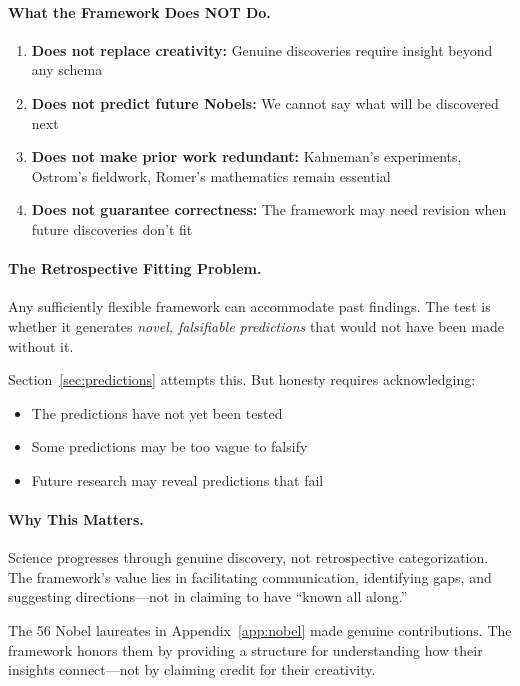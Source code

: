 \paragraph{What the Framework Does NOT Do.}
\begin{enumerate}
  \item \textbf{Does not replace creativity:} Genuine discoveries require insight
        beyond any schema
  \item \textbf{Does not predict future Nobels:} We cannot say what will be 
        discovered next
  \item \textbf{Does not make prior work redundant:} Kahneman's experiments,
        Ostrom's fieldwork, Romer's mathematics remain essential
  \item \textbf{Does not guarantee correctness:} The framework may need revision
        when future discoveries don't fit
\end{enumerate}

\paragraph{The Retrospective Fitting Problem.}
Any sufficiently flexible framework can accommodate past findings.
The test is whether it generates \emph{novel, falsifiable predictions}
that would not have been made without it.

Section~\ref{sec:predictions} attempts this. But honesty requires acknowledging:
\begin{itemize}
  \item The predictions have not yet been tested
  \item Some predictions may be too vague to falsify
  \item Future research may reveal predictions that fail
\end{itemize}

\paragraph{Why This Matters.}
Science progresses through genuine discovery, not retrospective categorization.
The framework's value lies in facilitating communication, identifying gaps,
and suggesting directions---not in claiming to have ``known all along.''

The 56 Nobel laureates in Appendix~\ref{app:nobel} made genuine contributions.
The framework honors them by providing a structure for understanding how their
insights connect---not by claiming credit for their creativity.

